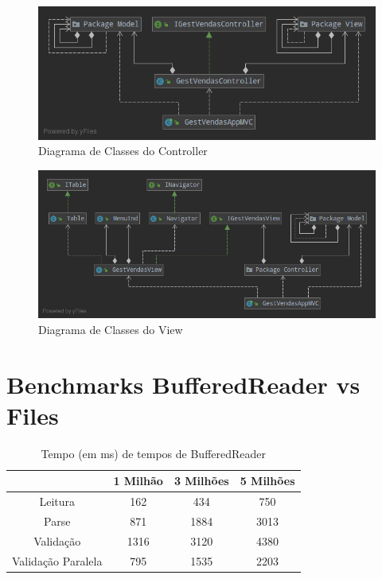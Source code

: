 \documentclass[a4paper]{report}
\begin{document}
\begin{figure}[H]
    \begin{center}
        \includegraphics[width=1\textwidth]{viewGraph.png}\par
        \caption{Diagrama de Classes do Controller}
    \end{center}
\end{figure}

\begin{figure}[H]
    \begin{center}
        \includegraphics[width=1\textwidth]{controllerGraph.png}\par
        \caption{Diagrama de Classes do View}
    \end{center}
\end{figure}

\chapter{Benchmarks BufferedReader vs Files}\label{chap:brf}

\begin{table}[H]
    \begin{center}
        \begin{tabular}{| c | c | c | c |}
            \hline
            & 1 Milhão & 3 Milhões & 5 Milhões \\
            \hline
            Leitura & 162 & 434 & 750 \\
            \hline
            Parse & 871 & 1884 & 3013 \\
            \hline
            Validação & 1316 & 3120 & 4380 \\
            \hline
            Validação Paralela & 795 & 1535 & 2203 \\
            \hline

        \end{tabular}
        \caption{Tempo (em ms) de tempos de BufferedReader} 
        \label{tab:BF}
    \end{center}
\end{table}
\end{document}

